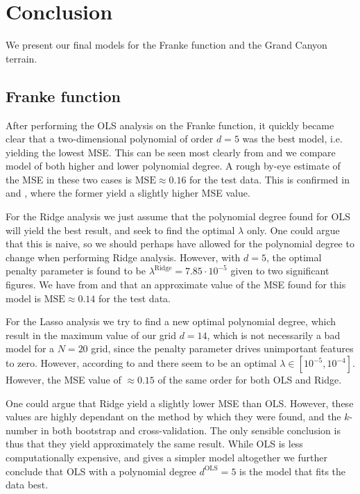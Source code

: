 \section{Conclusion}\label{sec:conclusion}


We present our final models for the Franke function and the Grand Canyon terrain. 


\subsection{Franke function}
 
After performing the OLS analysis on the Franke function, it quickly became clear that a two-dimensional polynomial of order $d=5$ was the best model, i.e. yielding the lowest MSE. This can be seen most clearly from  and  we compare model of both higher and lower polynomial degree. A rough by-eye estimate of the MSE in these two cases is $\mathrm{MSE}\approx 0.16$ for the test data. This is confirmed in  and , where the former yield a slightly higher MSE value. 

For the Ridge analysis we just assume that the polynomial degree found for OLS will yield the best result, and seek to find the optimal $\lambda$ only. One could argue that this is naive, so we should perhaps have allowed for the polynomial degree to change when performing Ridge analysis. However, with $d=5$, the optimal penalty parameter is found to be $\lambda^\mathrm{Ridge} = 7.85\cdot10^{-5}$ given to two significant figures. We have from  and  that an approximate value of the MSE found for this model is $\mathrm{MSE} \approx 0.14$ for the test data. 

For the Lasso analysis we try to find a new optimal polynomial degree, which result in the maximum value of our grid $d=14$, which is not necessarily a bad model for a $N=20$ grid, since the penalty parameter drives unimportant features to zero. However, according to  and  there seem to be an optimal $\lambda\in[10^{-5}, 10^{-4}]$. However, the MSE value of $\approx 0.15$ of the same order for both OLS and Ridge. 

One could argue that Ridge yield a slightly lower MSE than OLS. However, these values are highly dependant on the method by which they were found, and the $k$-number in both bootstrap and cross-validation. The only sensible conclusion is thus that they yield approximately the same result. While OLS is less computationally expensive, and gives a simpler model altogether we further conclude that OLS with a polynomial degree $d^\text{OLS}=5$ is the model that fits the data best. 

